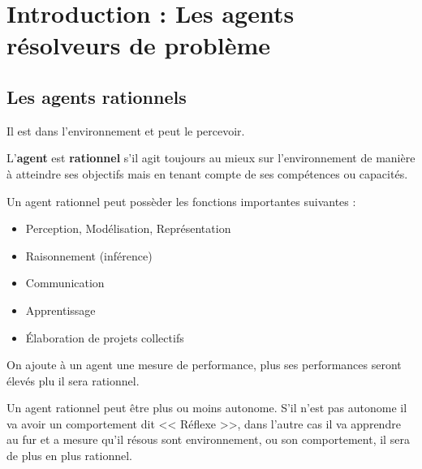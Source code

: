 \documentclass[12pt,a4paper,openany]{book}
\begin{document}
	\thispagestyle{empty} %
	\titleBC 
	\dominitoc
	\setcounter{tocdepth}{1}
	\setcounter{secnumdepth}{3}
	\setcounter{minitocdepth}{1}

	\chapter{Introduction : Les agents résolveurs de problème}
	\section*{Les agents rationnels}
	Il est dans l'environnement et peut le percevoir. 

	\begin{definition}
		L'\textbf{agent} est \textbf{rationnel} s'il agit toujours au mieux sur l'environnement de manière à atteindre ses objectifs mais en tenant compte de ses
	compétences ou capacités.
	\end{definition}

	Un agent rationnel peut possèder les fonctions importantes suivantes : 
	\begin{itemize}
		\item Perception, Modélisation, Représentation	
		\item Raisonnement (inférence)
		\item Communication
		\item Apprentissage
		\item Élaboration de projets collectifs
	\end{itemize}

	On ajoute à un agent une mesure de performance, plus ses performances seront élevés plu il sera rationnel.

	Un agent rationnel peut être plus ou moins autonome. S'il n'est pas autonome il va avoir un comportement dit << Réflexe >>, dans l'autre cas il va
	apprendre au fur et a mesure qu'il résous sont environnement, ou son comportement, il sera de plus en plus rationnel. \\
\end{document}
